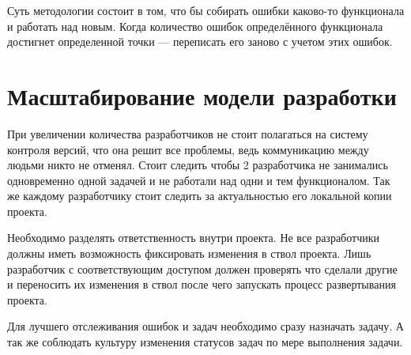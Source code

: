 Суть  методологии состоит в том, что бы собирать ошибки каково-то функционала и работать над новым. Когда количество ошибок определённого функционала достигнет определенной точки --- переписать его заново с учетом этих ошибок.


\section{  Масштабирование модели разработки } \label{sect3_19}

При увеличении количества разработчиков не стоит полагаться на систему контроля версий, что она решит все проблемы, ведь коммуникацию между людьми никто не отменял. Стоит следить чтобы 2 разработчика не занимались одновременно одной задачей и не работали над одни и тем функционалом. Так же каждому разработчику стоит следить за актуальностью его локальной копии проекта.

Необходимо разделять ответственность внутри проекта. Не все разработчики должны иметь возможность фиксировать изменения в ствол проекта. Лишь разработчик с соответствующим доступом должен проверять что сделали другие и переносить их изменения в ствол после чего запускать процесс развертывания проекта.


Для лучшего отслеживания ошибок и задач необходимо сразу назначать задачу. А так же соблюдать культуру изменения статусов задач по мере выполнения задачи.






 
 
 

 



































\clearpage



